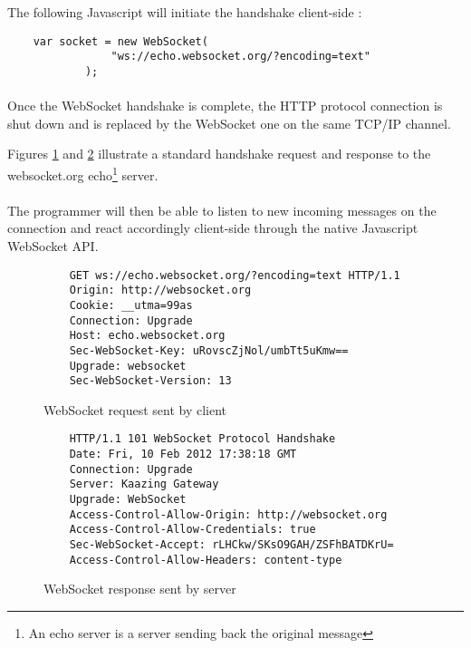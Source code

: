 The following Javascript will initiate the handshake client-side :

\begin{verbatim}
    var socket = new WebSocket(
                "ws://echo.websocket.org/?encoding=text"
            );
\end{verbatim}

\paragraph{} Once the WebSocket handshake is complete, the HTTP protocol 
connection is shut down and is replaced by the WebSocket one on the same TCP/IP 
channel.

Figures \ref{fig:ws-handshake-request} and 
\ref{fig:ws-handshake-response} illustrate a standard handshake request and 
response to the websocket.org echo\footnote{An echo server is a server sending 
back the original message} server.

\paragraph{} The programmer will then be able to listen to new incoming 
messages on the connection and react accordingly client-side through the native 
Javascript WebSocket API.

\begin{figure}[h]
    \begin{verbatim}
    GET ws://echo.websocket.org/?encoding=text HTTP/1.1
    Origin: http://websocket.org
    Cookie: __utma=99as
    Connection: Upgrade
    Host: echo.websocket.org
    Sec-WebSocket-Key: uRovscZjNol/umbTt5uKmw==
    Upgrade: websocket
    Sec-WebSocket-Version: 13
    \end{verbatim}
    \caption{WebSocket request sent by client \cite{websockets.org}}
    \label{fig:ws-handshake-request}
\end{figure}


\begin{figure}[h]
    \begin{verbatim}
    HTTP/1.1 101 WebSocket Protocol Handshake
    Date: Fri, 10 Feb 2012 17:38:18 GMT
    Connection: Upgrade
    Server: Kaazing Gateway
    Upgrade: WebSocket
    Access-Control-Allow-Origin: http://websocket.org
    Access-Control-Allow-Credentials: true
    Sec-WebSocket-Accept: rLHCkw/SKsO9GAH/ZSFhBATDKrU=
    Access-Control-Allow-Headers: content-type
    \end{verbatim}
    \caption{WebSocket response sent by server \cite{websockets.org}}
    \label{fig:ws-handshake-response}
\end{figure}

